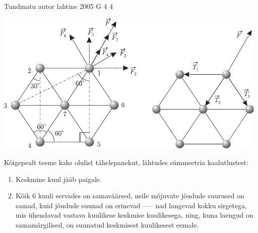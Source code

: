 \documentclass[11pt]{article}
\begin{document}
{%
{Tundmatu autor} %
{lahtine} %
{2005} %
{G 4} %
{4} %
{

\ifSolution
\begin{center}
	\includegraphics[width=\linewidth]{2005-lahg-04-lah}
\end{center}

Kõigepealt teeme kaks olulist tähelepanekut, lähtudes sümmeetria kaalutlustest:
\begin{enumerate}[wide=0pt, label={\arabic*)}]
	\item Keskmine kuul jääb paigale.
	\item Kõik 6 kuuli servades on samaväärsed, neile mõjuvate jõudude suurused on samad, kuid jõudude suunad on erinevad –--- nad langevad kokku sirgetega, mis ühendavad vastava kuulikese keskmise kuulikesega, ning, kuna laengud on samamärgilised, on suunatud keskmisest kuulikesest eemale.
\end{enumerate}

}}
\end{document}
